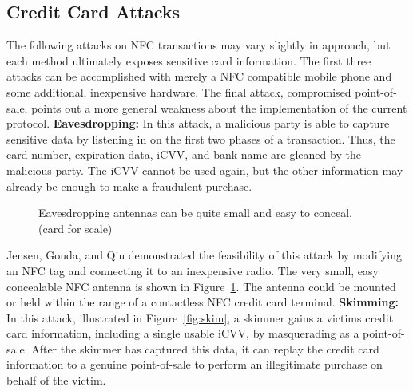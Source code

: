 \documentclass{sig-alternate}
\begin{document}
\subsection{Credit Card Attacks}
\label{sec:attacks}
The following attacks on NFC transactions may vary slightly in approach, but each method ultimately exposes sensitive card information. The first three attacks can be accomplished with merely a NFC compatible mobile phone and some additional, inexpensive hardware. The final attack, compromised point-of-sale, points out a more general weakness about the implementation of the current protocol.
\vspace{2mm}\newline
\noindent\textbf{Eavesdropping:}
In this attack, a malicious party is able to capture sensitive data by listening in on the first two phases of a transaction. Thus, the card number, expiration data, iCVV, and bank name are gleaned by the malicious party. The iCVV cannot be used again, but the other information may already be enough to make a fraudulent purchase.

\begin{figure}
\centering
{}
\caption{Eavesdropping antennas can be quite small and easy to conceal.~\cite{CC2016} (card for scale)}
\label{fig:antenna}
\end{figure}

Jensen, Gouda, and Qiu demonstrated the feasibility of this attack by modifying an NFC tag and connecting it to an inexpensive radio. The very small, easy concealable NFC antenna is shown in Figure~\ref{fig:antenna}. The antenna could be mounted or held within the range of a contactless NFC credit card terminal.
\vspace{2mm}\newline
\noindent\textbf{Skimming:}
In this attack, illustrated in Figure~\ref{fig:skim}, a skimmer gains a victims credit card information, including a single usable iCVV, by masquerading as a point-of-sale. After the skimmer has captured this data, it can replay the credit card information to a genuine point-of-sale to perform an illegitimate purchase on behalf of the victim.
\end{document}
